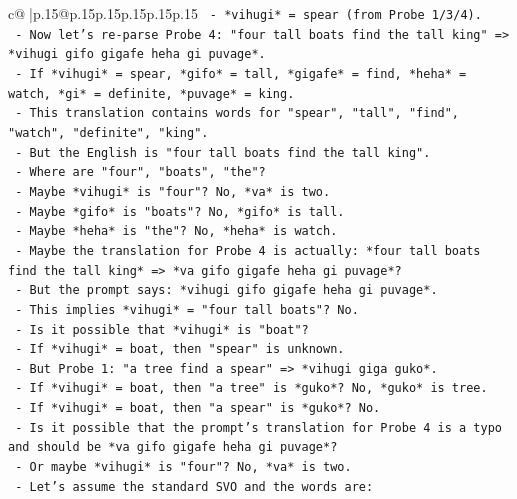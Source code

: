 \documentclass{article}
\begin{document}
{\begin{supertabular}{c@{$\;$}|p{.15\linewidth}@{}p{.15\linewidth}p{.15\linewidth}p{.15\linewidth}p{.15\linewidth}p{.15\linewidth}}
{{{\texttt{              {-} *vihugi* = spear (from Probe 1/3/4).} \\
\texttt{            {-} Now let's re{-}parse Probe 4: "four tall boats find the tall king" => *vihugi gifo gigafe heha gi puvage*.} \\
\texttt{              {-} If *vihugi* = spear, *gifo* = tall, *gigafe* = find, *heha* = watch, *gi* = definite, *puvage* = king.} \\
\texttt{              {-} This translation contains words for "spear", "tall", "find", "watch", "definite", "king".} \\
\texttt{              {-} But the English is "four tall boats find the tall king".} \\
\texttt{              {-} Where are "four", "boats", "the"?} \\
\texttt{              {-} Maybe *vihugi* is "four"? No, *va* is two.} \\
\texttt{              {-} Maybe *gifo* is "boats"? No, *gifo* is tall.} \\
\texttt{              {-} Maybe *heha* is "the"? No, *heha* is watch.} \\
\texttt{              {-} Maybe the translation for Probe 4 is actually: *four tall boats find the tall king* => *va gifo gigafe heha gi puvage*?} \\
\texttt{              {-} But the prompt says: *vihugi gifo gigafe heha gi puvage*.} \\
\texttt{              {-} This implies *vihugi* = "four tall boats"? No.} \\
\texttt{              {-} Is it possible that *vihugi* is "boat"?} \\
\texttt{                {-} If *vihugi* = boat, then "spear" is unknown.} \\
\texttt{                {-} But Probe 1: "a tree find a spear" => *vihugi giga guko*.} \\
\texttt{                {-} If *vihugi* = boat, then "a tree" is *guko*? No, *guko* is tree.} \\
\texttt{                {-} If *vihugi* = boat, then "a spear" is *guko*? No.} \\
\texttt{              {-} Is it possible that the prompt's translation for Probe 4 is a typo and should be *va gifo gigafe heha gi puvage*?} \\
\texttt{              {-} Or maybe *vihugi* is "four"? No, *va* is two.} \\
\texttt{              {-} Let's assume the standard SVO and the words are:} \\
}}}
\end{supertabular}}
\end{document}
